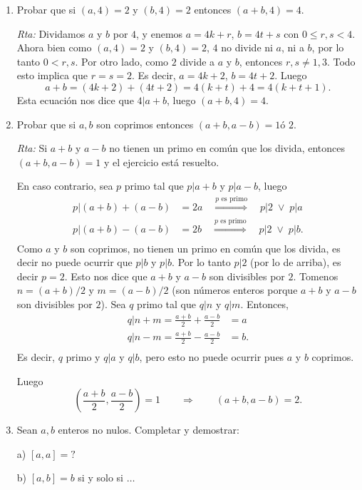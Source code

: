 \documentclass[a4paper,12pt,twoside,spanish,reqno]{amsbook}
\numberwithin{equation}{section}
\newcommand{\rta}{\noindent\textit{Rta: }}
\begin{document}
\begin{enumerate}
\item Probar que si $(a,4)=2$ y $(b,4)=2$ entonces $(a+b,4)=4$.

\rta Dividamos $a$ y $b$ por $4$, y enemos $a = 4k+ r$, $b = 4t + s$ con $ 0 \le r,s < 4$. Ahora bien como  $(a,4)=2$ y $(b,4)=2$, $4$ no divide ni $a$, ni a $b$, por  lo tanto $0 < r,s$. Por otro lado, como $2$ divide a $a$ y $b$,  entonces $r,s \not= 1,3$. Todo esto implica que $r=s=2$. Es decir, $a = 4k+ 2$, $b = 4t + 2$. Luego 
$$
a + b =  ( 4k+ 2) + ( 4t + 2) = 4(k+t) +4 = 4(k+t+1). 
$$
Esta ecuación nos dice que $4| a+b$, luego $(a+b,4)=4$.

\item Probar que si $a,b$ son coprimos entonces $(a+b,a-b)=1 \text{
ó } 2 $.

\rta Si $a+b$ y $a-b$ no tienen un primo en común que los divida, entonces $(a+b,a-b)=1 $ y el ejercicio está resuelto. 

En caso contrario, sea $p$ primo tal que $p | a+b$ y $p|a-b$, luego 
\begin{align*}
    p|  (a+b) + (a-b) &= 2a \quad \stackrel{\text{$p$ es primo}}{\Longrightarrow} \quad p|2 \;\vee\; p|a \\
    p|  (a+b) - (a-b) &= 2b \quad \stackrel{\text{$p$ es primo}}{\Longrightarrow} \quad p|2 \;\vee\; p|b. \\
\end{align*} 
Como $a$ y $b$ son coprimos, no tienen un primo en común que los divida, es decir no puede ocurrir  que  $p | b$ y $p|b$. Por lo tanto $p|2$ (por lo de arriba),  es decir $p =2$. Esto nos dice que  $a+b$ y $a-b$ son divisibles por $2$. Tomenos $n = (a+b)/2$ y $m = (a-b)/2$  (son números enteros porque  $a+b$ y $a-b$ son divisibles por $2$). Sea $q$ primo tal que $q|n$ y $q|m$. Entonces, 
\begin{align*}
    q| n+m =  \frac{a+b}{2} + \frac{a-b}{2} &= a  \\
    q| n-m =  \frac{a+b}{2} - \frac{a-b}{2} &= b .\\
\end{align*} 
Es  decir, $q$ primo y $q|a$ y $q|b$, pero esto no puede ocurrir pues $a$ y $b$ coprimos. 


Luego
$$
( \frac{a+b}{2}, \frac{a-b}{2}) =1 \qquad \Rightarrow\qquad (a+b,a-b) =2.
$$


\item Sean $a,b$ enteros no nulos. Completar y demostrar:

a)  $[a,a]=?$

b)  $[a,b]=b$ si y solo si $\ldots$


\end{enumerate}
\end{document}
